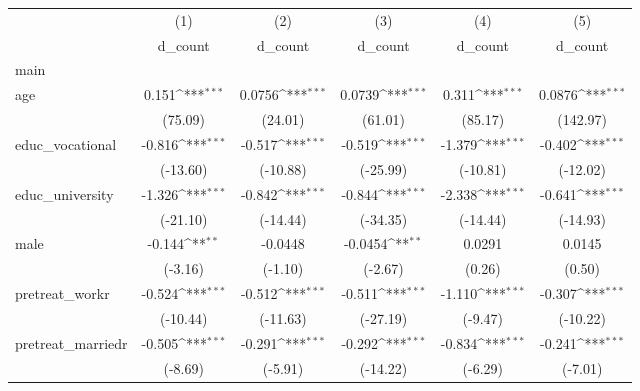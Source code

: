 {
\def\sym#1{\ifmmode^{#1}\else\(^{#1}\)\fi}
\begin{tabular}{l*{5}{c}}
\hline\hline
            &\multicolumn{1}{c}{(1)}&\multicolumn{1}{c}{(2)}&\multicolumn{1}{c}{(3)}&\multicolumn{1}{c}{(4)}&\multicolumn{1}{c}{(5)}\\
            &\multicolumn{1}{c}{d\_count}&\multicolumn{1}{c}{d\_count}&\multicolumn{1}{c}{d\_count}&\multicolumn{1}{c}{d\_count}&\multicolumn{1}{c}{d\_count}\\
\hline
main        &                     &                     &                     &                     &                     \\
age         &       0.151\sym{***}&      0.0756\sym{***}&      0.0739\sym{***}&       0.311\sym{***}&      0.0876\sym{***}\\
            &     (75.09)         &     (24.01)         &     (61.01)         &     (85.17)         &    (142.97)         \\
[1em]
educ\_vocational&      -0.816\sym{***}&      -0.517\sym{***}&      -0.519\sym{***}&      -1.379\sym{***}&      -0.402\sym{***}\\
            &    (-13.60)         &    (-10.88)         &    (-25.99)         &    (-10.81)         &    (-12.02)         \\
[1em]
educ\_university&      -1.326\sym{***}&      -0.842\sym{***}&      -0.844\sym{***}&      -2.338\sym{***}&      -0.641\sym{***}\\
            &    (-21.10)         &    (-14.44)         &    (-34.35)         &    (-14.44)         &    (-14.93)         \\
[1em]
male        &      -0.144\sym{**} &     -0.0448         &     -0.0454\sym{**} &      0.0291         &      0.0145         \\
            &     (-3.16)         &     (-1.10)         &     (-2.67)         &      (0.26)         &      (0.50)         \\
[1em]
pretreat\_workr&      -0.524\sym{***}&      -0.512\sym{***}&      -0.511\sym{***}&      -1.110\sym{***}&      -0.307\sym{***}\\
            &    (-10.44)         &    (-11.63)         &    (-27.19)         &     (-9.47)         &    (-10.22)         \\
[1em]
pretreat\_marriedr&      -0.505\sym{***}&      -0.291\sym{***}&      -0.292\sym{***}&      -0.834\sym{***}&      -0.241\sym{***}\\
            &     (-8.69)         &     (-5.91)         &    (-14.22)         &     (-6.29)         &     (-7.01)         \\

\end{tabular}}
